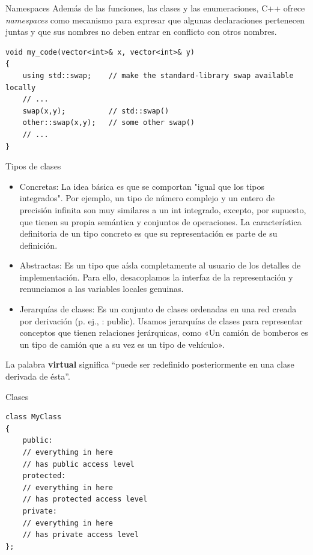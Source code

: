 \documentclass[11pt]{beamer}
\begin{document}
\begin{frame}[fragile]{Namespaces}
\small
Además de las funciones, las clases y las enumeraciones, C++ ofrece \textit{namespaces} como mecanismo para expresar que algunas declaraciones pertenecen juntas y que sus nombres no deben entrar en conflicto con otros nombres.	
\begin{lstlisting}
void my_code(vector<int>& x, vector<int>& y)
{
	using std::swap; 	// make the standard-library swap available locally
	// ...
	swap(x,y); 			// std::swap()
	other::swap(x,y); 	// some other swap()
	// ...
}
\end{lstlisting}
\end{frame}

\begin{frame}{Tipos de clases}
	\small
	\begin{itemize}
		\item Concretas: La idea básica es que se comportan "igual que los tipos integrados". Por ejemplo, un tipo de número complejo y un entero de precisión infinita son muy similares a un int integrado, excepto, por supuesto, que tienen su propia semántica y conjuntos de operaciones. La característica definitoria de un tipo concreto es que su representación es parte de su definición.
		\item Abstractas: Es un tipo que aísla completamente al usuario de los detalles de implementación. Para ello, desacoplamos la interfaz de la representación y renunciamos a las variables locales genuinas.
		\item Jerarquías de clases: Es un conjunto de clases ordenadas en una red creada por derivación (p. ej., : public). Usamos jerarquías de clases para representar conceptos que tienen relaciones jerárquicas, como «Un camión de bomberos es un tipo de camión que a su vez es un tipo de vehículo». 
	\end{itemize}
	\vspace{2mm}
	La palabra \textbf{virtual} significa “puede ser redefinido posteriormente en una clase derivada de ésta”.
	
\end{frame}

\begin{frame}[fragile]{Clases}
\begin{lstlisting}
class MyClass
{
	public:
	// everything in here
	// has public access level
	protected:
	// everything in here
	// has protected access level
	private:
	// everything in here
	// has private access level
};
\end{lstlisting}
\end{frame}
	
\end{document}
